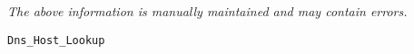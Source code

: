 \label{pkg:dns\_host\_lookup}

{\tiny \it The above information is manually maintained and may contain errors.}
\begin{verbatim}
Dns_Host_Lookup
\end{verbatim}
